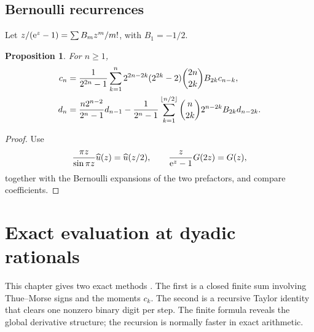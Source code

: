 \documentclass[11pt]{article}
\newtheorem{proposition}[theorem]{Proposition}
\theoremstyle{definition}
\theoremstyle{remark}
\begin{document}
\subsection{Bernoulli recurrences}
Let $z/(\mathrm e^z-1)=\sum B_mz^m/m!$, with $B_1=-1/2$.
\begin{proposition}\label{prop:Bernoulli}
For $n\ge1$,
\begin{align}
 c_n&=\frac1{2^{2n}-1}\sum_{k=1}^{n}2^{2n-2k}(2^{2k}-2)
 \binom{2n}{2k}B_{2k}c_{n-k},\label{eq:c-Bernoulli}\\
 d_n&=\frac{n2^{n-2}}{2^n-1}d_{n-1}
 -\frac1{2^n-1}\sum_{k=1}^{\left\lfloor n/2\right\rfloor}
 \binom n{2k}2^{n-2k}B_{2k}d_{n-2k}.\label{eq:d-Bernoulli}
\end{align}
\end{proposition}
\begin{proof}
Use
\[
 \frac{\pi z}{\sin\pi z}\widehat u(z)=\widehat u(z/2),
 \qquad
 \frac{z}{\mathrm e^z-1}G(2z)=G(z),
\]
together with the Bernoulli expansions of the two prefactors, and compare coefficients.
\end{proof}

\section{Exact evaluation at dyadic rationals}\label{sec:dyadic}
This chapter gives two exact methods \cite{AriasArithmetic,Haugland}.  The first is a closed finite sum involving Thue--Morse signs and the moments $c_k$.  The second is a recursive Taylor identity that clears one nonzero binary digit per step.  The finite formula reveals the global derivative structure; the recursion is normally faster in exact arithmetic.
\end{document}
